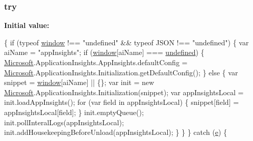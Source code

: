 \subsubsection[{\texorpdfstring{try}{try}}]{\setlength{\rightskip}{0pt plus 5cm}try}\hypertarget{_scripts_2ai_80_822_89-build00167_8js_abe4cc9788f52e49485473dc699537388}{}\label{_scripts_2ai_80_822_89-build00167_8js_abe4cc9788f52e49485473dc699537388}
{\bfseries Initial value\+:}
\begin{DoxyCode}
\{
            \textcolor{keywordflow}{if} (typeof \hyperlink{obj_2_release_2_package_2_package_tmp_2_scripts_2jquery-1_810_82_8js_a04a8a2bbfa9c15500892b8e5033d625b}{window} !== \textcolor{stringliteral}{"undefined"} && typeof JSON !== \textcolor{stringliteral}{"undefined"}) \{
                var aiName = \textcolor{stringliteral}{"appInsights"};
                \textcolor{keywordflow}{if} (\hyperlink{obj_2_release_2_package_2_package_tmp_2_scripts_2jquery-1_810_82_8js_a04a8a2bbfa9c15500892b8e5033d625b}{window}[aiName] === \hyperlink{obj_2_release_2_package_2_package_tmp_2_scripts_2jquery-1_810_82_8js_a08113a236cc18d2a9d5ce27e638012be}{undefined}) \{
                    \hyperlink{obj_2_release_2_package_2_package_tmp_2_scripts_2ai_80_822_89-build00167_8js_af7b21097393c8dc2ece8949358ff0e27}{Microsoft}.ApplicationInsights.AppInsights.defaultConfig = 
      \hyperlink{obj_2_release_2_package_2_package_tmp_2_scripts_2ai_80_822_89-build00167_8js_af7b21097393c8dc2ece8949358ff0e27}{Microsoft}.ApplicationInsights.Initialization.getDefaultConfig();
                \}
                \textcolor{keywordflow}{else} \{
                    var snippet = \hyperlink{obj_2_release_2_package_2_package_tmp_2_scripts_2jquery-1_810_82_8js_a04a8a2bbfa9c15500892b8e5033d625b}{window}[aiName] || \{\};
                    var init = \textcolor{keyword}{new} \hyperlink{obj_2_release_2_package_2_package_tmp_2_scripts_2ai_80_822_89-build00167_8js_af7b21097393c8dc2ece8949358ff0e27}{Microsoft}.ApplicationInsights.Initialization(snippet);
                    var appInsightsLocal = init.loadAppInsights();
                    \textcolor{keywordflow}{for} (var field in appInsightsLocal) \{
                        snippet[field] = appInsightsLocal[field];
                    \}
                    init.emptyQueue();
                    init.pollInteralLogs(appInsightsLocal);
                    init.addHousekeepingBeforeUnload(appInsightsLocal);
                \}
            \}
        \}
        \textcolor{keywordflow}{catch} (\hyperlink{obj_2_release_2_package_2_package_tmp_2_scripts_2jquery-1_810_82_8min_8js_a2c038346d47955cbe2cb91e338edd7e1}{e}) \{

\end{DoxyCode}
